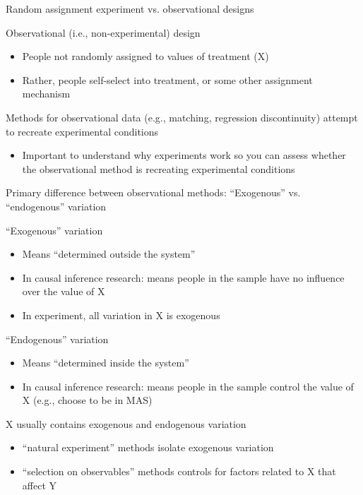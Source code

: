 \begin{frame}{Random assignment experiment vs. observational designs}
	
	Observational (i.e., non-experimental) design
	\begin{itemize}
		\item People not randomly assigned to values of treatment (X)
		\item Rather, people self-select into treatment, or some other assignment mechanism
	\end{itemize}
	\vspace{2mm}	
	Methods for observational data (e.g., matching, regression discontinuity) attempt to recreate experimental conditions
	\begin{itemize}
		\item Important to understand why experiments work so you can assess whether the observational method is recreating experimental conditions
	\end{itemize}
	
\end{frame}

\begin{frame}{Primary difference between observational methods: ``Exogenous'' vs. ``endogenous'' variation}
	
	``Exogenous'' variation
		\begin{itemize}
			\item Means ``determined outside the system''
			\item In causal inference research: means people in the sample have no influence over the value of X
			\item In experiment, all variation in X is exogenous
		\end{itemize}
	\vspace{2mm}			
	``Endogenous'' variation
		\begin{itemize}
			\item Means ``determined inside the system''
			\item In causal inference research: means people in the sample control the value of X (e.g., choose to be in MAS)
		\end{itemize}
	\vspace{2mm}		
	X usually contains exogenous and endogenous variation
	\begin{itemize}
		\item ``natural experiment'' methods isolate exogenous variation
		\item ``selection on observables'' methods controls for factors related to X that affect Y
	\end{itemize}
	
	

\end{frame}

